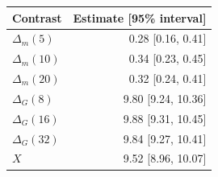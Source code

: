 \begin{tabular}{@{}lr@{}}
\toprule
Contrast & Estimate [95\% interval] \\
\midrule
$\Delta_m(5)$ & 0.28 [0.16, 0.41] \\
$\Delta_m(10)$ & 0.34 [0.23, 0.45] \\
$\Delta_m(20)$ & 0.32 [0.24, 0.41] \\
$\Delta_G(8)$ & 9.80 [9.24, 10.36] \\
$\Delta_G(16)$ & 9.88 [9.31, 10.45] \\
$\Delta_G(32)$ & 9.84 [9.27, 10.41] \\
$X$ & 9.52 [8.96, 10.07] \\
\bottomrule
\end{tabular}

